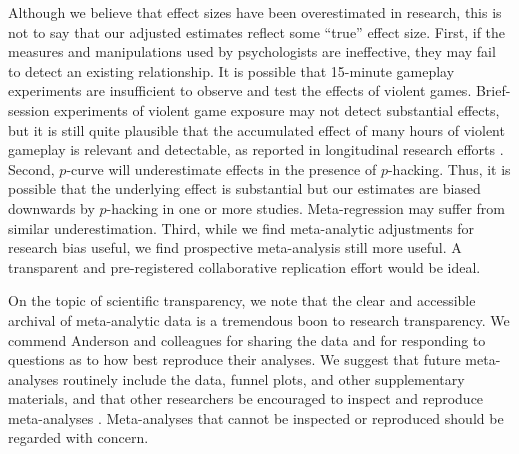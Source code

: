 \documentclass[man]{apa6}
\begin{document}

Although we believe that effect sizes have been overestimated in research, this is not to say that our adjusted estimates reflect some ``true'' effect size. First, if the measures and manipulations used by psychologists are ineffective, they may fail to detect an existing relationship. It is possible that 15-minute gameplay experiments are insufficient to observe and test the effects of violent games. Brief-session experiments of violent game exposure may not detect substantial effects, but it is still quite plausible that the accumulated effect of many hours of violent gameplay is relevant and detectable, as reported in longitudinal research efforts \citep[e.g.,][]{Willoughby:etal:2012}. Second, $p$-curve will underestimate effects in the presence of $p$-hacking. Thus, it is possible that the underlying effect is substantial but our estimates are biased downwards by $p$-hacking in one or more studies. Meta-regression may suffer from similar underestimation. Third, while we find meta-analytic adjustments for research bias useful, we find prospective meta-analysis still more useful. A transparent and pre-registered collaborative replication effort would be ideal.

On the topic of scientific transparency, we note that the clear and accessible archival of meta-analytic data is a tremendous boon to research transparency. We commend Anderson and colleagues for sharing the data and for responding to questions as to how best reproduce their analyses. We suggest that future meta-analyses routinely include the data, funnel plots, and other supplementary materials, and that other researchers be encouraged to inspect and reproduce meta-analyses \citep{Lakens:etal:InPress}. Meta-analyses that cannot be inspected or reproduced should be regarded with concern.

\end{document}
